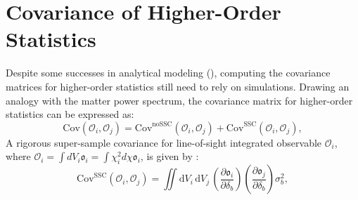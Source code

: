 \section{Covariance of Higher-Order Statistics}
Despite some successes in analytical modeling (\citealt{2018PhRvD..97d3532C, 2018A&A...611A..83L, 2019A&A...624A..61L, 2023OJAp....6E...1U}), computing the covariance matrices for higher-order statistics  still need to rely on simulations. Drawing an analogy with the matter power spectrum, the covariance matrix for higher-order statistics can be expressed as:
\begin{equation}
    \mathrm{Cov}(\mathcal{O}_i, \mathcal{O}_j) = \mathrm{Cov}^{\mathrm{noSSC}}(\mathcal{O}_i, \mathcal{O}_j) + \mathrm{Cov}^{\mathrm{SSC}}(\mathcal{O}_i, \mathcal{O}_j),
\end{equation}
A rigorous super-sample covariance for line-of-sight integrated observable $\mathcal{O}_i$, where $\mathcal{O}_i = \int dV_i \mathfrak{o}_i = \int \chi_i^2 d\chi \mathfrak{o}_i$, is given by \citep{2016JCAP...08..005L}:
\begin{equation}
    \mathrm{Cov}^{\mathrm{SSC}}(\mathcal{O}_i, \mathcal{O}_j) = 
    \iint \mathrm{d}V_i \, \mathrm{d}V_j \,
    \left(
        \frac{\partial \mathfrak{o}_i}{\partial \delta_b}
    \right)
    \left(
        \frac{\partial \mathfrak{o}_j}{\partial \delta_b}
    \right)
    \sigma_b^2, 
\end{equation}